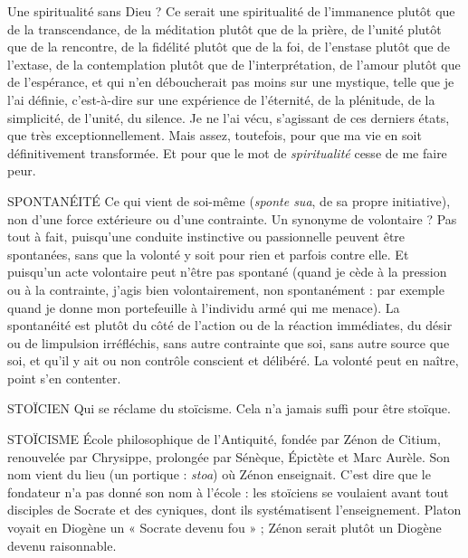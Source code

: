 Une spiritualité sans Dieu ? Ce serait une spiritualité de l’immanence
plutôt que de la transcendance, de la méditation plutôt que de la prière, de
l'unité plutôt que de la rencontre, de la fidélité plutôt que de la foi, de l’enstase
plutôt que de l’extase, de la contemplation plutôt que de l'interprétation, de
l'amour plutôt que de l’espérance, et qui n’en déboucherait pas moins sur une
mystique, telle que je l’ai définie, c’est-à-dire sur une expérience de l'éternité,
de la plénitude, de la simplicité, de l’unité, du silence. Je ne l’ai vécu, s’agissant
de ces derniers états, que très exceptionnellement. Mais assez, toutefois,
pour que ma vie en soit définitivement transformée. Et pour que le mot de {\it spiritualité}
cesse de me faire peur.

SPONTANÉITÉ Ce qui vient de soi-même ({\it sponte sua}, de sa propre initiative),
non d’une force extérieure ou d’une contrainte. Un
synonyme de volontaire ? Pas tout à fait, puisqu’une conduite instinctive ou
passionnelle peuvent être spontanées, sans que la volonté y soit pour rien et
parfois contre elle. Et puisqu’un acte volontaire peut n'être pas spontané
(quand je cède à la pression ou à la contrainte, j’agis bien volontairement, non
spontanément : par exemple quand je donne mon portefeuille à l'individu
armé qui me menace). La spontanéité est plutôt du côté de l’action ou de la
réaction immédiates, du désir ou de limpulsion irréfléchis, sans autre
contrainte que soi, sans autre source que soi, et qu’il y ait ou non contrôle conscient
et délibéré. La volonté peut en naître, point s’en contenter.

STOÏCIEN Qui se réclame du stoïcisme. Cela n’a jamais suffi pour être stoïque.

STOÏCISME École philosophique de l'Antiquité, fondée par Zénon de Citium,
renouvelée par Chrysippe, prolongée par Sénèque, Épictète et
Marc Aurèle. Son nom vient du lieu (un portique : {\it stoa}) où Zénon enseignait.
C’est dire que le fondateur n’a pas donné son nom à l’école : les stoïciens se
voulaient avant tout disciples de Socrate et des cyniques, dont ils systématisent
l’enseignement. Platon voyait en Diogène un « Socrate devenu fou » ; Zénon
serait plutôt un Diogène devenu raisonnable.

